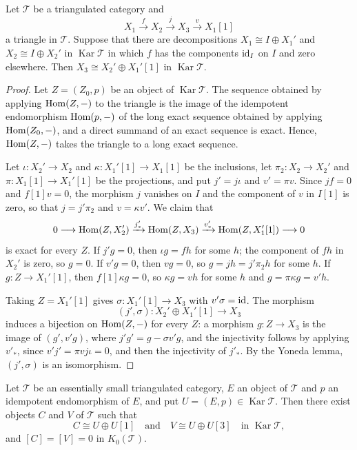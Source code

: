 \begin{lemma}
  \label{lemma:cone-splitting}
  Let $\mathcal{T}$ be a triangulated category and
  \[
    X_1\xrightarrow{f}X_2\xrightarrow{j}X_3\xrightarrow{v}X_1[1]
  \]
  a triangle in $\mathcal{T}$. Suppose that there are decompositions
  ${X_1\cong I\oplus X_1'}$ and ${X_2}\cong{ I\oplus X_2'}$ in
  $\operatorname{Kar}\mathcal{T}$ in which $f$ has the components $\id[I]$
  on $I$ and zero elsewhere. Then
  ${X_3}\cong{ X_2'\oplus X_1'[1]}$ in $\operatorname{Kar}\mathcal{T}$.
\end{lemma}

\begin{proof}
  Let ${Z=(Z_0,p)}$ be an object of $\operatorname{Kar}\mathcal{T}$. The
  sequence obtained by applying $\Hom{Z}{-}$ to the triangle is the image of
  the idempotent endomorphism $\Hom{p}{-}$ of the long exact sequence obtained
  by applying $\Hom{Z_0}{-}$, and a direct summand of an exact sequence is
  exact. Hence, $\Hom{Z}{-}$ takes the triangle to a long exact sequence.

  Let ${\iota\colon X_2'\to X_2}$ and ${\kappa\colon X_1'[1]\to X_1[1]}$ be the
  inclusions, let ${\pi_2\colon X_2\to X_2'}$ and ${\pi\colon X_1[1]\to X_1'[1]}$
  be the projections, and put ${j'=j\iota}$ and ${v'=\pi v}$. Since ${jf=0}$ and
  ${f[1]v=0}$, the morphism $j$ vanishes on $I$ and the component of $v$ in
  $I[1]$ is zero, so that ${j=j'\pi_2}$ and ${v=\kappa v'}$. We claim that
  \[
    0\longrightarrow\Hom{Z}{X_2'}\xrightarrow{j'_*}\Hom{Z}{X_3}
    \xrightarrow{v'_*}\Hom{Z}{X_1'[1]}\longrightarrow0
  \]
  is exact for every $Z$. If ${j'g=0}$, then ${\iota g=fh}$ for some $h$; the
  component of $fh$ in $X_2'$ is zero, so ${g=0}$. If ${v'g=0}$, then ${vg=0}$, so
  ${g=jh=j'\pi_2h}$ for some $h$. If ${g\colon Z\to X_1'[1]}$, then
  ${f[1]\kappa g=0}$, so ${\kappa g=vh}$ for some $h$ and ${g=\pi\kappa g=v'h}$.

  Taking ${Z=X_1'[1]}$ gives ${\sigma\colon X_1'[1]\to X_3}$ with ${v'\sigma=\id}$.
  The morphism
  \[
    (j',\sigma)\colon X_2'\oplus X_1'[1]\longrightarrow X_3
  \]
  induces a
  bijection on $\Hom{Z}{-}$ for every $Z$: a morphism ${g\colon Z\to X_3}$ is the
  image of $(g',v'g)$, where ${j'g'=g-\sigma v'g}$, and the injectivity follows by
  applying $v'_*$, since ${v'j'=\pi vj\iota=0}$, and then the injectivity of
  $j'_*$. By the Yoneda lemma,
  $(j',\sigma)$ is an isomorphism.
\end{proof}

\begin{proposition}
  \label{prop:odd-double}
  Let $\mathcal{T}$ be an essentially small triangulated category, $E$ an
  object of $\mathcal{T}$ and $p$ an idempotent endomorphism of $E$, and put
  ${U=(E,p)\in\operatorname{Kar}\mathcal{T}}$. Then there exist objects $C$ and
  $V$ of $\mathcal{T}$ such that
  \[
    C\cong U\oplus U[1]\quad\text{and}\quad V\cong U\oplus U[3]
    \quad\text{in }\operatorname{Kar}\mathcal{T},
  \]
  and ${[C]=[V]=0}$ in $K_0(\mathcal{T})$.
\end{proposition}

